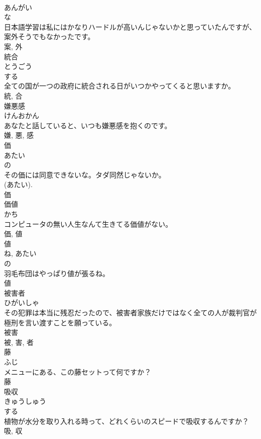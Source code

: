 \documentclass[8pt]{extreport}
\begin{document}
\begin{CJK}{UTF8}{min}
\\	あんがい	
\\	な 
\\	日本語学習は私にはかなりハードルが高いんじゃないかと思っていたんですが、案外そうでもなかったです。	
\\	案, 外	
\\	統合	
\\	とうごう	
\\	する 
\\	全ての国が一つの政府に統合される日がいつかやってくると思いますか。	
\\	統, 合	
\\	嫌悪感	
\\	けんおかん	
\\	あなたと話していると、いつも嫌悪感を抱くのです。	
\\	嫌, 悪, 感	
\\	価	
\\	あたい	
\\	の 
\\	その価には同意できないな。タダ同然じゃないか。	
\\	(あたい). 
\\	価	
\\	価値	
\\	かち	
\\	コンピュータの無い人生なんて生きてる価値がない。	
\\	価, 値	
\\	値	
\\	ね, あたい	
\\	の 
\\	羽毛布団はやっぱり値が張るね。	
\\	値	
\\	被害者	
\\	ひがいしゃ	
\\	その犯罪は本当に残忍だったので、被害者家族だけではなく全ての人が裁判官が極刑を言い渡すことを願っている。	
\\	被害 
\\	被, 害, 者	
\\	藤	
\\	ふじ	
\\	メニューにある、この藤セットって何ですか？	
\\	藤	
\\	吸収	
\\	きゅうしゅう	
\\	する 
\\	植物が水分を取り入れる時って、どれくらいのスピードで吸収するんですか？	
\\	吸, 収	

\end{CJK}
\end{document}
